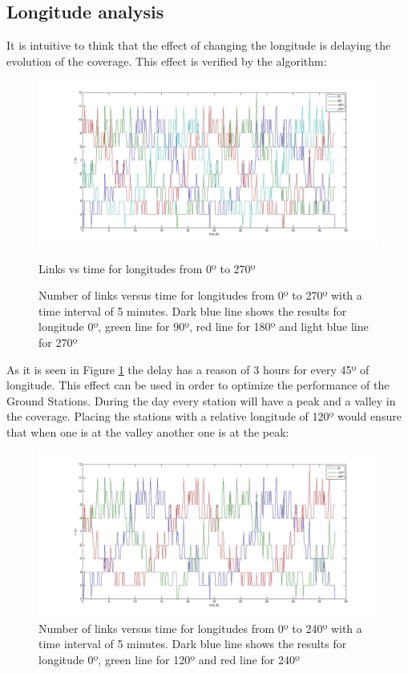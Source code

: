 \subsection{Longitude analysis}
It is intuitive to think that the effect of changing the longitude is delaying the evolution of the coverage. This effect is verified by the algorithm:
\begin{figure}[H]
\begin{center}
\includegraphics[scale=0.30]{0_90_270_long.jpg}
\caption{Links vs time for longitudes from 0º to 270º}
\caption[Links vs time for longitudes from 0º to 270º]{Number of links versus time for longitudes from 0º to 270º with a time interval of 5 minutes. Dark blue line shows the results for longitude 0º, green line for 90º, red line for 180º and light blue line for 270º}
\label{fig:long1}
\end{center}
\end{figure}
As it is seen in Figure \ref{fig:long1} the delay has a reason of 3 hours for every 45º of longitude. This effect can be used in order to optimize the performance of the Ground Stations. During the day every station will have a peak and a valley in the coverage. Placing the stations with a relative longitude of 120º would ensure that when one is at the valley another one is at the peak:
\begin{figure}[H]
\begin{center}
\includegraphics[scale=0.30]{0_120_240_long.jpg}
\caption[Links vs time for longitudes from 0º to 240º]{Number of links versus time for longitudes from 0º to 240º with a time interval of 5 minutes. Dark blue line shows the results for longitude 0º, green line for 120º and red line for 240º}
\label{fig:long2}
\end{center}
\end{figure}
